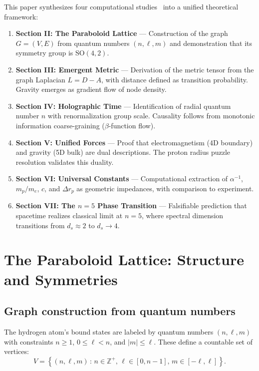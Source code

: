 \documentclass[aps,prd,twocolumn,superscriptaddress,groupedaddress,showpacs]{revtex4-2}
\newcommand{\alphainv}{\ensuremath{\alpha^{-1}}}
\newcommand{\SO}{\ensuremath{\text{SO}}}
\begin{document}
This paper synthesizes four computational studies~\cite{Louthan_I,Louthan_II,Louthan_III,Louthan_IV} into a unified theoretical framework:
\begin{enumerate}
\item \textbf{Section II: The Paraboloid Lattice} --- Construction of the graph $G = (V, E)$ from quantum numbers $(n, \ell, m)$ and demonstration that its symmetry group is $\SO(4,2)$.

\item \textbf{Section III: Emergent Metric} --- Derivation of the metric tensor from the graph Laplacian $L = D - A$, with distance defined as transition probability. Gravity emerges as gradient flow of node density.

\item \textbf{Section IV: Holographic Time} --- Identification of radial quantum number $n$ with renormalization group scale. Causality follows from monotonic information coarse-graining ($\beta$-function flow).

\item \textbf{Section V: Unified Forces} --- Proof that electromagnetism (4D boundary) and gravity (5D bulk) are dual descriptions. The proton radius puzzle resolution validates this duality.

\item \textbf{Section VI: Universal Constants} --- Computational extraction of $\alphainv$, $m_p/m_e$, $c$, and $\Delta r_p$ as geometric impedances, with comparison to experiment.

\item \textbf{Section VII: The $n=5$ Phase Transition} --- Falsifiable prediction that spacetime realizes classical limit at $n=5$, where spectral dimension transitions from $d_s \approx 2$ to $d_s \to 4$.
\end{enumerate}

\section{The Paraboloid Lattice: Structure and Symmetries}

\subsection{Graph construction from quantum numbers}

The hydrogen atom's bound states are labeled by quantum numbers $(n, \ell, m)$ with constraints $n \geq 1$, $0 \leq \ell < n$, and $|m| \leq \ell$. These define a countable set of vertices:
\begin{equation}
V = \left\{ (n, \ell, m) \,:\, n \in \mathbb{Z}^+,\, \ell \in [0, n-1],\, m \in [-\ell, \ell] \right\}.
\end{equation}
\end{document}
